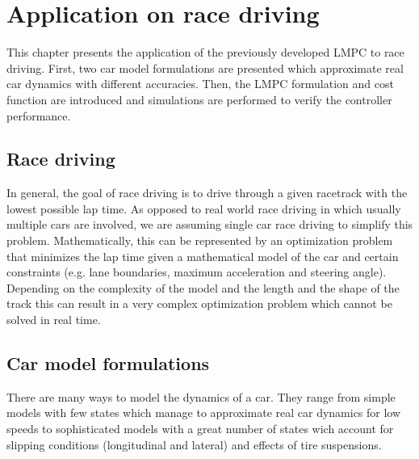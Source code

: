\chapter{Application on race driving}
This chapter presents the application of the previously developed LMPC to race driving. First, two car model formulations are presented which approximate real car dynamics with different accuracies. Then, the LMPC formulation and cost function are introduced and simulations are performed to verify the controller performance.

\section{Race driving}
In general, the goal of race driving is to drive through a given racetrack with the lowest possible lap time. As opposed to real world race driving in which usually multiple cars are involved, we are assuming single car race driving to simplify this problem. Mathematically, this can be represented by an optimization problem that minimizes the lap time given a mathematical model of the car and certain constraints (e.g. lane boundaries, maximum acceleration and steering angle). Depending on the complexity of the model and the length and the shape of the track this can result in a very complex optimization problem which cannot be solved in real time.

\section{Car model formulations}
There are many ways to model the dynamics of a car. They range from simple models with few states which manage to approximate real car dynamics for low speeds to sophisticated models with a great number of states wich account for slipping conditions (longitudinal and lateral) and effects of tire suspensions.

